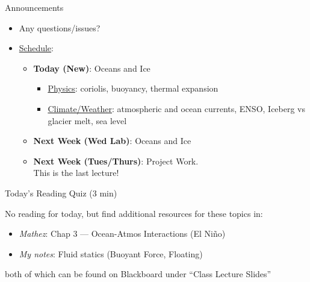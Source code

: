 \documentclass[12pt]{beamer}
\title%
{}
\subtitle
{} %
\author%
{Ben Holder}%
\date%
{}
\begin{document}

\begin{frame}{Announcements}
	\begin{itemize}
	\addtolength{\itemsep}{0.5\baselineskip}
	\item Any questions/issues?
	\item \underline{Schedule}:
		\begin{itemize}
		\item[]{\bf Today (New)}: Oceans and Ice 
			\begin{itemize}
			\item \underline{Physics}: coriolis,  buoyancy, thermal expansion
			\item \underline{Climate/Weather}: atmospheric and ocean currents, ENSO, Iceberg vs glacier melt, sea level
			\end{itemize}
		\item[]{\bf Next Week (Wed Lab)}: Oceans and Ice
		\item[] {\bf Next Week (Tues/Thurs)}: Project Work.\\This is the last lecture!
		\end{itemize}
	\end{itemize}

\end{frame}
\begin{frame}{Today's Reading Quiz (3 min)}


%	
%
%
%
%


No reading for today, but find additional resources for these topics in:
	\begin{itemize}
	\item {\em Mathez}: Chap 3 --- Ocean-Atmos Interactions (El Ni\~no)
	\item {\em My notes}: Fluid statics (Buoyant Force, Floating) 
	\end{itemize}
both of which can be found on Blackboard under ``Class Lecture Slides''
	

\end{frame}
\end{document}
